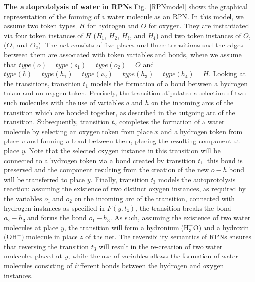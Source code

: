 \documentclass[runningheads]{llncs}
\newcommand{\type}{\mathit{type}}
\begin{document}
\textbf{The autoprotolysis of water in RPNs } Fig.~\ref{RPNmodel} shows the graphical representation of the forming of a water molecule as an RPN.
In this model, we assume two token types, $H$ for hydrogen
and $O$ for oxygen. They are instantiated via four token instances of $H$ ($H_1$, $H_2$, $H_3$, and $H_4$) and two token instances of
$O$, ($O_1$ and $O_2$). The net consists of five places and three transitions and the edges between
them are associated with token variables and bonds, where we assume that $\type(o)=\type(o_1)=\type(o_2) = O$
and $\type(h)=\type(h_1)=\type(h_2)=\type(h_3)=\type(h_4)=H$. 
Looking at the transitions, transition $t_1$ models the formation of a bond between a hydrogen
token and an oxygen token. Precisely, the transition stipulates a selection of two such
molecules with the use
of variables $o$ and $h$ on the incoming arcs of the transition which are bonded
together, as described in the outgoing arc of the transition.
Subsequently, transition $t_2$ completes
the formation of a water molecule by selecting an oxygen token from place $x$ and
a hydrogen token from place $v$ and forming a bond between them, placing the resulting component at place $y$. Note that the selected oxygen instance in this transition will be connected to a hydrogen token via a bond 
created by transition $t_1$; this bond is preserved and the component resulting from the creation of
the new $o-h$ bond will be transferred to place $y$.
Finally, transition $t_3$ models the autoprotolysis reaction: assuming the existence of two distinct oxygen
instances, as required by the variables $o_1$ and $o_2$ on the incoming arc of the transition, connected
with hydrogen instances as specified in $F(y,t_3)$, the transition breaks the bond $o_2-h_3$ and forms the
bond  $o_1-h_3$.  As such, assuming the existence of two water molecules at place $y$, the transition
will form  a hydronium  (H$_3^+$O) and a hydroxin (OH$^-$) molecule in place $z$ of the net.
The reversibility semantics of RPNs ensures that  reversing the transition $t_3$ will result in the re-creation
of  two water molecules placed at $y$, while the use of variables allows the formation of water molecules consisting
of different bonds between the hydrogen and oxygen instances. 
\end{document}
